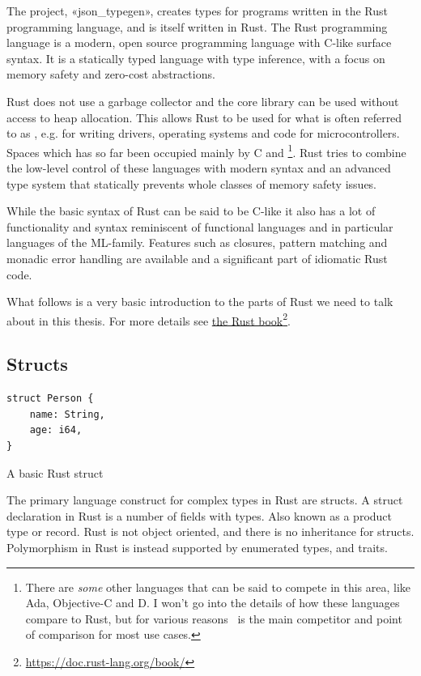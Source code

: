 The project, «json_typegen», creates types for programs written in the Rust programming language, and is itself written in Rust. The Rust programming language is a modern, open source programming language with C-like surface syntax. It is a statically typed language with type inference, with a focus on memory safety and zero-cost abstractions.

Rust does not use a garbage collector and the core library can be used without access to heap allocation. This allows Rust to be used for what is often referred to as , e.g. for writing drivers, operating systems and code for microcontrollers. Spaces which has so far been occupied mainly by C and \cpp\footnote{There are \emph{some} other languages that can be said to compete in this area, like Ada, Objective-C and D. I won't go into the details of how these languages compare to Rust, but for various reasons \cpp\ is the main competitor and point of comparison for most use cases.}. Rust tries to combine the low-level control of these languages with modern syntax and an advanced type system that statically prevents whole classes of memory safety issues\cite{the-rust-language}.

While the basic syntax of Rust can be said to be C-like it also has a lot of functionality and syntax reminiscent of functional languages and in particular languages of the ML-family. Features such as closures, pattern matching and monadic error handling are available and a significant part of idiomatic Rust code.

What follows is a very basic introduction to the parts of Rust we need to talk about in this thesis. For more details see \href{https://doc.rust-lang.org/book/}{the Rust book}\footnote{\url{https://doc.rust-lang.org/book/}}.

\subsection{Structs}

\begin{listing}[ht!]
\begin{verbatim}
struct Person {
    name: String,
    age: i64,
}
\end{verbatim}
\caption{A basic Rust struct}
\label{lst:struct}
\end{listing}

The primary language construct for complex types in Rust are structs. A struct declaration in Rust is a number of fields with types. Also known as a product type or record. Rust is not object oriented, and there is no inheritance for structs. Polymorphism in Rust is instead supported by enumerated types, and traits.

